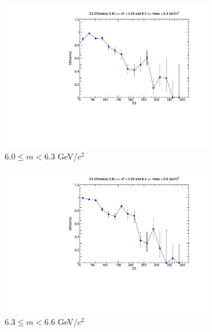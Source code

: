 \begin{figure}[p]
\begin{subfigure}[b]{0.32\textwidth}
        \includegraphics[width=\textwidth]{./kTrackerEfficiencyPlots/D2_Efficiency_xF10_mass6.pdf}
        \caption{$6.0 \leq m < 6.3$ GeV/$c^2$}
        \label{fig:xF10_mass6}
    \end{subfigure}
    \hfill
    \begin{subfigure}[b]{0.32\textwidth}
        \centering
        \includegraphics[width=\textwidth]{./kTrackerEfficiencyPlots/D2_Efficiency_xF10_mass7.pdf}
        \caption{$6.3 \leq m < 6.6$ GeV/$c^2$}
        \label{fig:xF10_mass7}
    \end{subfigure}
    \hfill
    \begin{subfigure}[b]{0.32\textwidth}
        \centering

\end{subfigure}
\end{figure}
